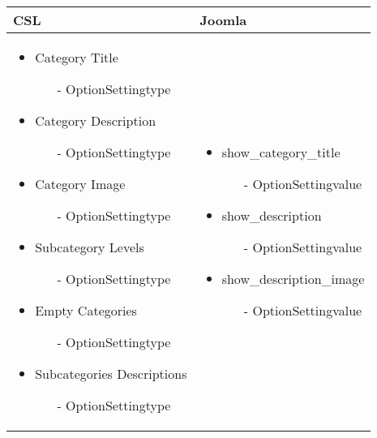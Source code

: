 \begin{minipage}{0.7\textwidth}
\begin{tabular}{|p{} | p{}|}
\hline
\textbf{CSL} & \textbf{Joomla} \\ 
\hline
\begin{itemize}
	\item Category Title 
		\begin{enumerate}
			\item[-] OptionSettingtype
		\end{enumerate} 
	\item Category Description
	\begin{enumerate}
		\item[-] OptionSettingtype
	\end{enumerate}
	\item Category Image
	\begin{enumerate}
		\item[-] OptionSettingtype
	\end{enumerate} 
	\item Subcategory Levels
	\begin{enumerate}
		\item[-] OptionSettingtype
	\end{enumerate} 
	\item Empty Categories
	\begin{enumerate}
			\item[-] OptionSettingtype
	\end{enumerate}
	\item Subcategories Descriptions
	\begin{enumerate}
		\item[-] OptionSettingtype
	\end{enumerate}
\end{itemize}
 & 
\begin{itemize}
	\item show\_category\_title 
		\begin{enumerate}
			\item[-] OptionSettingvalue
		\end{enumerate} 
	\item show\_description
	\begin{enumerate}
		\item[-] OptionSettingvalue
	\end{enumerate}
	\item show\_description\_image
	\begin{enumerate}
		\item[-] OptionSettingvalue

\end{enumerate}
\end{itemize}
\end{tabular}
\end{minipage}
